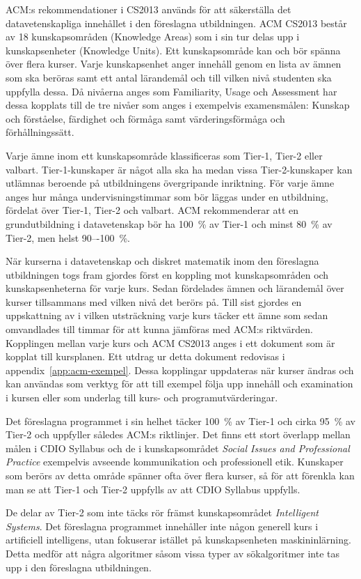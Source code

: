  ACM:s rekommendationer i CS2013 används för att säkerställa det datavetenskapliga innehållet i den föreslagna utbildningen. ACM CS2013 består av 18 kunskapsområden (Knowledge Areas) som i sin tur delas upp i kunskapsenheter (Knowledge Units). Ett kunskapsområde kan och bör spänna över flera kurser. Varje kunskapsenhet anger innehåll genom en lista av ämnen som ska beröras samt ett antal lärandemål och till vilken nivå studenten ska uppfylla dessa. Då nivåerna anges som Familiarity, Usage och Assessment har dessa kopplats till de tre nivåer som anges i exempelvis examensmålen: Kunskap och förståelse, färdighet och förmåga samt värderingsförmåga och förhållningssätt.

Varje ämne inom ett kunskapsområde klassificeras som Tier-1, Tier-2 eller valbart. Tier-1-kunskaper är något alla ska ha medan vissa Tier-2-kunskaper kan utlämnas beroende på utbildningens övergripande inriktning. För varje ämne anges hur många undervisningstimmar som bör läggas under en utbildning, fördelat över Tier-1, Tier-2 och valbart. ACM rekommenderar att en grundutbildning i datavetenskap bör ha 100~\% av Tier-1 och minst 80~\% av Tier-2, men helst 90–-100~\%.

När kurserna i datavetenskap och diskret matematik inom den föreslagna utbildningen togs fram gjordes först en koppling mot kunskapsområden och kunskapsenheterna för varje kurs. Sedan fördelades ämnen och lärandemål över kurser tillsammans med vilken nivå det berörs på. Till sist gjordes en uppskattning av i vilken utsträckning varje kurs täcker ett ämne som sedan omvandlades till timmar för att kunna jämföras med ACM:s riktvärden. Kopplingen mellan varje kurs och ACM CS2013 anges i ett dokument som är kopplat till kursplanen. Ett utdrag ur detta dokument redovisas i appendix~\ref{app:acm-exempel}. Dessa kopplingar uppdateras när kurser ändras och kan användas som verktyg för att till exempel följa upp innehåll och examination i kursen eller som underlag till kurs- och programutvärderingar.

Det föreslagna programmet i sin helhet täcker 100~\% av Tier-1 och cirka 95~\% av Tier-2 och uppfyller således ACM:s riktlinjer. Det finns ett stort överlapp mellan målen i CDIO Syllabus och de i kunskapsområdet \emph{Social Issues and Professional Practice} exempelvis avseende kommunikation och professionell etik. Kunskaper som berörs av detta område spänner ofta över flera kurser, så för att förenkla kan man se att Tier-1 och Tier-2 uppfylls av att CDIO Syllabus uppfylls.

De delar av Tier-2 som inte täcks rör främst kunskapsområdet \emph{Intelligent Systems}. Det föreslagna programmet innehåller inte någon generell kurs i artificiell intelligens, utan fokuserar istället på kunskapsenheten maskininlärning. Detta medför att några algoritmer såsom vissa typer av sökalgoritmer inte tas upp i den föreslagna utbildningen.

